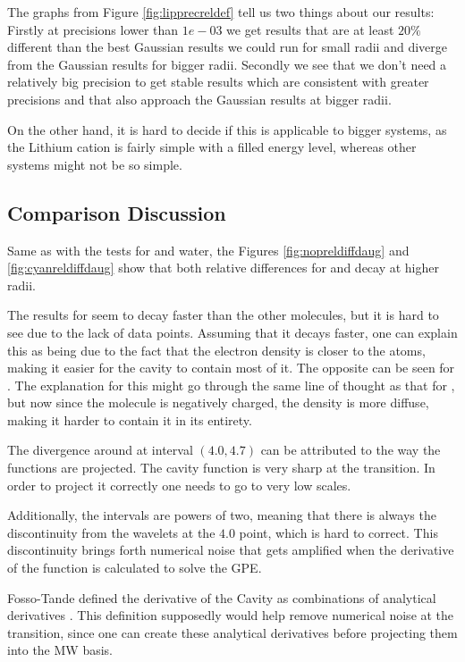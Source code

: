 \documentclass[../master_thesis.tex]{subfiles}
\begin{document}
The graphs from Figure \ref{fig:lipprecreldef} tell us two things about our results:
Firstly at precisions lower than $1e-03$ we get results that are at least $20\%$ different
than the best Gaussian results we could run for small radii and diverge from the
Gaussian results for bigger radii. Secondly we see that we don't need a relatively big
precision to get stable results which are consistent with greater precisions and
that also approach the Gaussian results at bigger radii.

On the other hand, it is hard to decide if this is applicable to bigger systems,
as the Lithium cation is fairly simple with a filled energy level, whereas
other systems might not be so simple.

\subsection{Comparison Discussion}
Same as with the tests for  and water, the Figures \ref{fig:nopreldiffdaug}
and  \ref{fig:cyanreldiffdaug} show that both relative differences for 
and  decay at higher radii.

The results for   seem to decay faster than the other molecules, but it
is hard to see due to the lack of data points. Assuming that it decays faster,
one can explain this as being due to the fact that the electron density is
closer to the atoms, making it easier for the cavity to contain most of it.
The opposite can be seen for . The explanation for this might go through
the same line of thought as that for , but now since the molecule is negatively
charged, the density is more diffuse, making it harder to contain it in its entirety.

The divergence around at interval $(4.0, 4.7)$ can be attributed to the way the
functions are projected. The cavity function is very sharp at the transition. In order to
project it correctly one needs to go to very low scales.

Additionally, the intervals are
powers of two, meaning that there is always the discontinuity from the wavelets at the
$4.0$ point, which is hard to correct. This discontinuity brings forth numerical
noise that gets amplified when the derivative of the function is calculated to solve the
\ac{GPE}.

Fosso-Tande defined the derivative of the Cavity as combinations of analytical
derivatives \cite{FossoTande:2013ka}. This definition supposedly would help
remove numerical noise at the transition, since one can create these analytical
derivatives before projecting them into the \ac{MW} basis.
\end{document}
